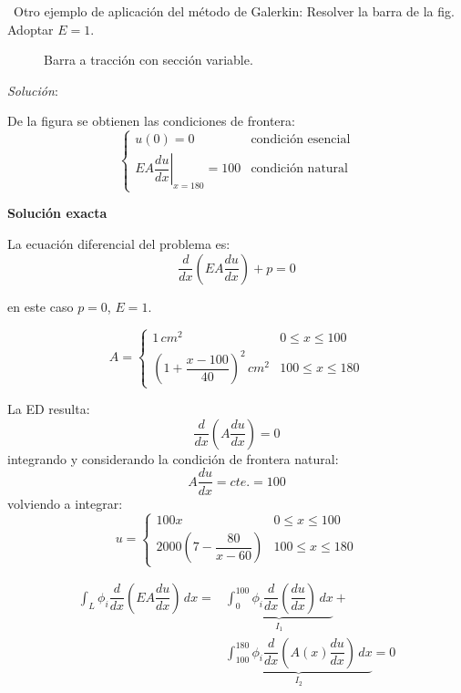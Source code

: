 \begin{example} \label{ex:galerkin2}
	\
	Otro ejemplo de aplicación del método de Galerkin: Resolver la barra de la fig. Adoptar $E = 1$.
	
	\begin{figure}[H]
		\centering
		
		\caption{Barra a tracción con sección variable.}
		\label{fig:ejm1}
	\end{figure}

\textit{Solución}:
\vspace{2mm}
		
	De la figura se obtienen las condiciones de frontera:
	\begin{equation*}
		\begin{cases}
			u(0) = 0 & \mbox{condición esencial} \\[2mm]
			\left. EA\dfrac{du}{dx} \right|_{x=180} = 100 & \mbox{condición natural}
		\end{cases}
	\end{equation*}
	
	\textbf{Solución exacta}
	
	La ecuación diferencial del problema es:
	\begin{equation*}
		\dfrac{d}{dx}\left( EA \dfrac{du}{dx} \right) + p = 0
	\end{equation*}
	
	en este caso $p = 0$, $E=1$.
	
	\[ A = \begin{cases}
		1 \, \unit{cm^2} & 0 \le x \le 100\\
		\left(1 + \dfrac{x-100}{40}\right)^2 \, \unit{cm^2} & 100 \le x \le 180
	\end{cases} \]
	
	La ED resulta:
	\[ \frac{d}{dx} \left(A \frac{du}{dx}\right) = 0 \]
	integrando y considerando la condición de frontera natural:
	\[A \frac{du}{dx} = cte. = 100\]
	volviendo a integrar:
	\[ u = \begin{cases}
		100x & 0 \le x \le 100\\
		2000\left(7 - \dfrac{80}{x - 60}\right) & 100 \le x \le 180
	\end{cases} \]
	
	
	\begin{equation*}
		\begin{split}
			\int_L \phi_i \dfrac{d}{dx}\left(EA\dfrac{du}{dx} \right)\, dx =& \underbrace{\int_{0}^{100} \phi_i \dfrac{d}{dx}\left( \dfrac{du}{dx} \right) \, dx}_{I_1} +\\ & \underbrace{\int_{100}^{180} \phi_i \dfrac{d}{dx}\left( A(x) \dfrac{du}{dx} \right) \, dx}_{I_2} = 0
		\end{split}
	\end{equation*}
	

\end{example}
